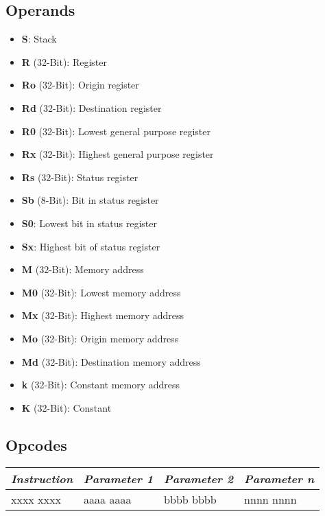 \documentclass[titlepage]{scrartcl}
\begin{document}
\subsection{Operands}
\begin{itemize}
	\item \textbf{S}: Stack
	\item \textbf{R} (32-Bit): Register
	\item \textbf{Ro} (32-Bit): Origin register
	\item \textbf{Rd} (32-Bit): Destination register
	\item \textbf{R0} (32-Bit): Lowest general purpose register
	\item \textbf{Rx} (32-Bit): Highest general purpose register \vspace{1ex}
	\item \textbf{Rs} (32-Bit): Status register
	\item \textbf{Sb} (8-Bit): Bit in status register
	\item \textbf{S0}: Lowest bit in status register
	\item \textbf{Sx}: Highest bit of status register \vspace{1ex}
	\item \textbf{M} (32-Bit): Memory address
	\item \textbf{M0} (32-Bit): Lowest memory address
	\item \textbf{Mx} (32-Bit): Highest memory address
	\item \textbf{Mo} (32-Bit): Origin memory address
	\item \textbf{Md} (32-Bit): Destination memory address
	\item \textbf{k} (32-Bit): Constant memory address \vspace{1ex}
	\item \textbf{K} (32-Bit): Constant
\end{itemize}
\subsection{Opcodes}
\begin{tabularx}{\textwidth}{|Y|Y|Y|Y|}
	\hline
	\itshape{Instruction} & \itshape{Parameter 1} & \itshape{Parameter 2} & \itshape{Parameter n} \\
	\hline
	xxxx xxxx             & aaaa aaaa             & bbbb bbbb             & nnnn nnnn             \\
	\hline
\end{tabularx}
\newpage
\end{document}
